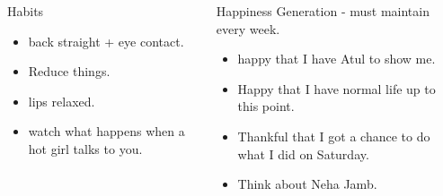 \documentclass[serif, mathserif, final]{beamer}
\begin{document}
{\begin{frame} {}
\begin{columns}
\begin{block}{Habits} 
  \begin{itemize} 
    \tiny \item \tiny back straight + eye contact. 
  \item \tiny Reduce things. 
  \item \tiny lips relaxed. 
  \item \tiny watch what happens when a hot girl talks to you. 
  \end{itemize} 
\end{block} 

\begin{block}{Happiness Generation - must maintain every week.}
\begin{itemize}
  \tiny \item \tiny happy that I have Atul to show me.  
  \item \tiny Happy that I have normal life up to this point.  
  \item \tiny Thankful that I got a chance to do what I did on Saturday. 
  \item \tiny Think about Neha Jamb. 
\end{itemize}
\end{block}

\begin{column}{0.27\linewidth}


\end{column}
\end{columns}
\end{frame}}
\end{document}
